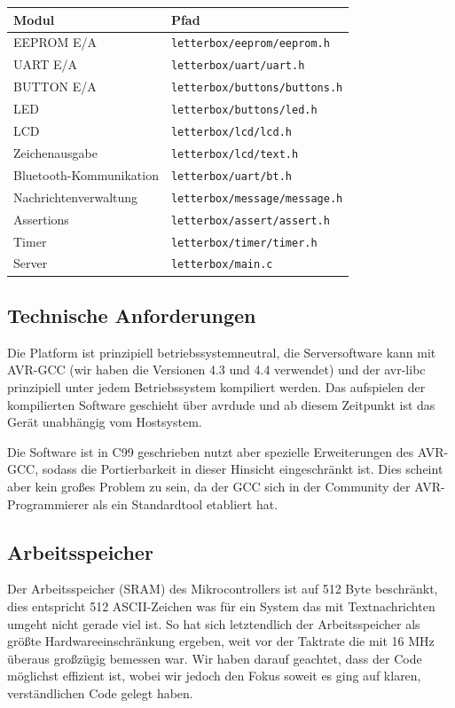 \documentclass[ngerman]{article}
\begin{document}
\begin{tabular}{|l|l|}
    \hline
    {\bf Modul} & {\bf Pfad} \\
    \hline
    \hline
    EEPROM E/A & {\tt letterbox/eeprom/eeprom.h} \\
    \hline
    UART E/A & {\tt letterbox/uart/uart.h} \\
    \hline
    BUTTON E/A & {\tt letterbox/buttons/buttons.h} \\
    \hline
    LED & {\tt letterbox/buttons/led.h} \\
    \hline
    LCD & {\tt letterbox/lcd/lcd.h} \\
    \hline
    Zeichenausgabe & {\tt letterbox/lcd/text.h} \\
    \hline
    Bluetooth-Kommunikation & {\tt letterbox/uart/bt.h} \\
    \hline
    Nachrichtenverwaltung & {\tt letterbox/message/message.h} \\
    \hline
    Assertions & {\tt letterbox/assert/assert.h} \\
    \hline
    Timer & {\tt letterbox/timer/timer.h} \\
    \hline
    Server & {\tt letterbox/main.c} \\
    \hline
\end{tabular}


\subsection{Technische Anforderungen}

Die Platform ist prinzipiell betriebssystemneutral, die Serversoftware kann mit
AVR-GCC (wir haben die Versionen 4.3 und 4.4 verwendet) und der avr-libc
prinzipiell unter jedem Betriebssystem kompiliert werden. Das aufspielen der
kompilierten Software geschieht über avrdude und ab diesem Zeitpunkt ist das
Gerät unabhängig vom Hostsystem.

Die Software ist in C99 geschrieben nutzt aber spezielle Erweiterungen des
AVR-GCC, sodass die Portierbarkeit in dieser Hinsicht eingeschränkt ist. Dies
scheint aber kein großes Problem zu sein, da der GCC sich in der Community der
AVR-Programmierer als ein Standardtool etabliert hat.

\subsection{Arbeitsspeicher}

Der Arbeitsspeicher (SRAM) des Mikrocontrollers ist auf 512 Byte beschränkt,
dies entspricht 512 ASCII-Zeichen was für ein System das mit Textnachrichten
umgeht nicht gerade viel ist. So hat sich letztendlich der Arbeitsspeicher als
größte Hardwareeinschränkung ergeben, weit vor der Taktrate die mit 16 MHz
überaus großzügig bemessen war. Wir haben darauf geachtet, dass der Code
möglichst effizient ist, wobei wir jedoch den Fokus soweit es ging auf klaren,
verständlichen Code gelegt haben.
\end{document}

